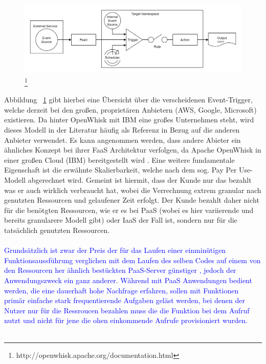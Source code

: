 \documentclass[11pt]{article}
\begin{document}
\begin{figure}[H]
\caption[FaaS Programming Model nach OpenWhisk]{\footnote{http://openwhisk.apache.org/documentation.html}}
\label{fig:openWhiskProgrammingModel}
\centering
\includegraphics[width=1\textwidth]{ProgrammingModel}
\end{figure}
Abbildung ~\ref{fig:openWhiskProgrammingModel} gibt hierbei eine Übersicht über die verscheidenen Event-Trigger, welche derzeit bei den großen, proprietären Anbietern (AWS, Google, Microsoft) existieren. Da hinter OpenWhisk mit IBM eine großes Unternehmen steht, wird dieses Modell in der Literatur häufig als Referenz in Bezug auf die anderen Anbieter verwendet. Es kann angenommen werden, dass andere Abieter ein ähnliches Konzept bei ihrer FaaS Architektur verfolgen, da Apache OpenWhisk in einer großen Cloud (IBM) bereitgestellt wird \cite{van2019spec}. Eine weitere fundamentale Eigenschaft ist die erwähnte Skalierbarkeit, welche nach dem sog. \glqq Pay Per Use\grqq{}-Modell abgerechnet wird. Gemeint ist hiermit, dass der Kunde nur das bezahlt was er auch wirklich verbraucht hat, wobei die Verrechnung extrem granular nach genutzten Ressourcen und gelaufener Zeit erfolgt. Der Kunde bezahlt daher nicht für die benötgten Ressourcen, wie er es bei PaaS (wobei es hier variierende und bereits granularere Modell gibt) oder IaaS der Fall ist, sondern nur für die tatsächlich genutzten Ressourcen. \\\\
\textcolor{blue}{Grundsätzlich ist zwar der Preis der für das Laufen einer einminütigen Funktionsaussführung verglichen mit dem Laufen des selben Codes auf einem von den Ressourcen her ähnlich bestückten PaaS-Server günstiger \cite{jonas2019cloud}, jedoch der Anwendungszweck ein ganz anderer. Während mit PaaS Anwendungen bedient werden, die eine dauerhaft hohe Nachfrage erfahren, sollen mit Funktionen primär einfache stark frequentierende Aufgaben geläst werden, bei denen der Nutzer nur für die Ressroucen bezahlen muss die die Funktion bei dem Aufruf nutzt und nicht für jene die ohen einkommende Aufrufe provisioniert wurden.} \\\\
\end{document}
